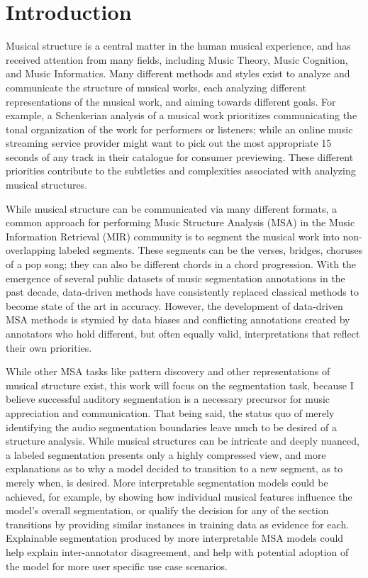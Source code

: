 \section{Introduction}
Musical structure is a central matter in the human musical experience, and has received attention from many fields, including Music Theory, Music Cognition, and Music Informatics.
Many different methods and styles exist to analyze and communicate the structure of musical works, each analyzing different representations of the musical work, and aiming towards different goals.
For example, a Schenkerian analysis of a musical work prioritizes communicating the tonal organization of the work for performers or listeners; while an online music streaming service provider might want to pick out the most appropriate 15 seconds of any track in their catalogue for consumer previewing.
These different priorities contribute to the subtleties and complexities associated with analyzing musical structures.

While musical structure can be communicated via many different formats, a common approach for performing Music Structure Analysis (MSA) in the Music Information Retrieval (MIR) community is to segment the musical work into non-overlapping labeled segments.
These segments can be the verses, bridges, choruses of a pop song; they can also be different chords in a chord progression.
With the emergence of several public datasets of music segmentation annotations in the past decade, data-driven methods have consistently replaced classical methods to become state of the art in accuracy.
However, the development of data-driven MSA methods is stymied by data biases and conflicting annotations created by annotators who hold different, but often equally valid, interpretations that reflect their own priorities.

While other MSA tasks like pattern discovery and other representations of musical structure exist, this work will focus on the segmentation task, because I believe successful auditory segmentation is a necessary precursor for music appreciation and communication. 
That being said, the status quo of merely identifying the audio segmentation boundaries leave much to be desired of a structure analysis.
While musical structures can be intricate and deeply nuanced, a labeled segmentation presents only a highly compressed view, and more explanations as to why a model decided to transition to a new segment, as to merely when, is desired.
More interpretable segmentation models could be achieved, for example, by showing how individual musical features influence the model's overall segmentation, or qualify the decision for any of the section transitions by providing similar instances in training data as evidence for each.
Explainable segmentation produced by more interpretable MSA models could help explain inter-annotator disagreement, and help with potential adoption of the model for more user specific use case scenarios.

